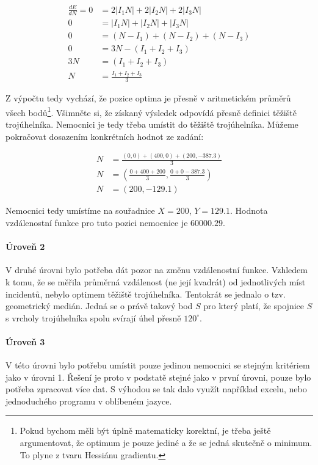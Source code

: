 \documentclass[12pt,a4paper]{article}
\begin{document}
\begin{align}
\frac{dE}{dN} = 0 &= 2|I_1 N| + 2|I_2N| + 2|I_3N| \nonumber \\
0 &= |I_1 N| + |I_2N| + |I_3N| \nonumber \\
0 &= (N-I_1) + (N-I_2) + (N-I_3) \nonumber \\
0 &= 3N - (I_1 + I_2 + I_3) \nonumber \\
3N &= (I_1 + I_2 + I_3) \nonumber \\
N &= \frac{I_1 + I_2 + I_3}{3} \nonumber
\end{align}

Z výpočtu tedy vychází, že pozice optima je přesně v aritmetickém průměrů
všech bodů\footnote{Pokud bychom měli být úplně matematicky korektní, je třeba
ještě argumentovat, že optimum je pouze jediné a že se jedná skutečně o minimum.
To plyne z tvaru Hessiánu gradientu.}. Všimněte si, že získaný výsledek
odpovídá přesně definici těžiště trojúhelníka. Nemocnici je tedy třeba umístit
do těžiště trojúhelníka. Můžeme pokračovat dosazením konkrétních hodnot ze zadání:

\begin{align}
N &= \frac{(0, 0) + (400, 0) + (200, -387.3)}{3} \nonumber \\
N &= \left( \frac{0 + 400 + 200}{3}, \frac{0 + 0 - 387.3}{3} \right) \nonumber \\
N &= (200, -129.1)  \nonumber
\end{align}

Nemocnici tedy umístíme na souřadnice $X=200$, $Y=129.1$. Hodnota vzdálenostní
funkce pro tuto pozici nemocnice je $60000.29$.

\paragraph*{Úroveň 2}
V druhé úrovni bylo potřeba dát pozor na změnu vzdálenostní funkce. Vzhledem k tomu, že se měřila průměrná vzdálenost (ne její kvadrát) od jednotlivých míst incidentů,
nebylo optimem těžiště trojúhelníka. Tentokrát se jednalo o tzv. geometrický medián. Jedná se o právě takový bod $S$ pro který platí, že spojnice $S$ s vrcholy trojúhelníka spolu svírají úhel přesně $120^\circ$.
\paragraph*{Úroveň 3}
V této úrovni bylo potřebu umístit pouze jedinou nemocnici se stejným kritériem jako v úrovni 1. Řešení je proto v podstatě stejné jako v první úrovni, pouze bylo potřeba zpracovat více dat. S výhodou se tak dalo využít například excelu, nebo jednoduchého programu v oblíbeném jazyce.
\end{document}

